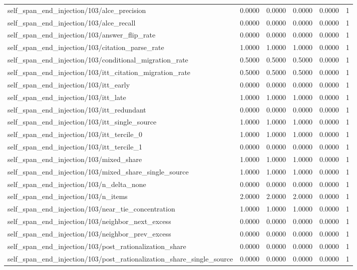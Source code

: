 \begin{table}[h]
\begin{tabular}{lrrrrr}
self_span_end_injection/103/alce_precision & 0.0000 & 0.0000 & 0.0000 & 0.0000 & 1 \\
self_span_end_injection/103/alce_recall & 0.0000 & 0.0000 & 0.0000 & 0.0000 & 1 \\
self_span_end_injection/103/answer_flip_rate & 0.0000 & 0.0000 & 0.0000 & 0.0000 & 1 \\
self_span_end_injection/103/citation_parse_rate & 1.0000 & 1.0000 & 1.0000 & 0.0000 & 1 \\
self_span_end_injection/103/conditional_migration_rate & 0.5000 & 0.5000 & 0.5000 & 0.0000 & 1 \\
self_span_end_injection/103/itt_citation_migration_rate & 0.5000 & 0.5000 & 0.5000 & 0.0000 & 1 \\
self_span_end_injection/103/itt_early & 0.0000 & 0.0000 & 0.0000 & 0.0000 & 1 \\
self_span_end_injection/103/itt_late & 1.0000 & 1.0000 & 1.0000 & 0.0000 & 1 \\
self_span_end_injection/103/itt_redundant & 0.0000 & 0.0000 & 0.0000 & 0.0000 & 1 \\
self_span_end_injection/103/itt_single_source & 1.0000 & 1.0000 & 1.0000 & 0.0000 & 1 \\
self_span_end_injection/103/itt_tercile_0 & 1.0000 & 1.0000 & 1.0000 & 0.0000 & 1 \\
self_span_end_injection/103/itt_tercile_1 & 0.0000 & 0.0000 & 0.0000 & 0.0000 & 1 \\
self_span_end_injection/103/mixed_share & 1.0000 & 1.0000 & 1.0000 & 0.0000 & 1 \\
self_span_end_injection/103/mixed_share_single_source & 1.0000 & 1.0000 & 1.0000 & 0.0000 & 1 \\
self_span_end_injection/103/n_delta_none & 0.0000 & 0.0000 & 0.0000 & 0.0000 & 1 \\
self_span_end_injection/103/n_items & 2.0000 & 2.0000 & 2.0000 & 0.0000 & 1 \\
self_span_end_injection/103/near_tie_concentration & 1.0000 & 1.0000 & 1.0000 & 0.0000 & 1 \\
self_span_end_injection/103/neighbor_next_excess & 0.0000 & 0.0000 & 0.0000 & 0.0000 & 1 \\
self_span_end_injection/103/neighbor_prev_excess & 0.0000 & 0.0000 & 0.0000 & 0.0000 & 1 \\
self_span_end_injection/103/post_rationalization_share & 0.0000 & 0.0000 & 0.0000 & 0.0000 & 1 \\
self_span_end_injection/103/post_rationalization_share_single_source & 0.0000 & 0.0000 & 0.0000 & 0.0000 & 1 \\

\end{tabular}
\end{table}
